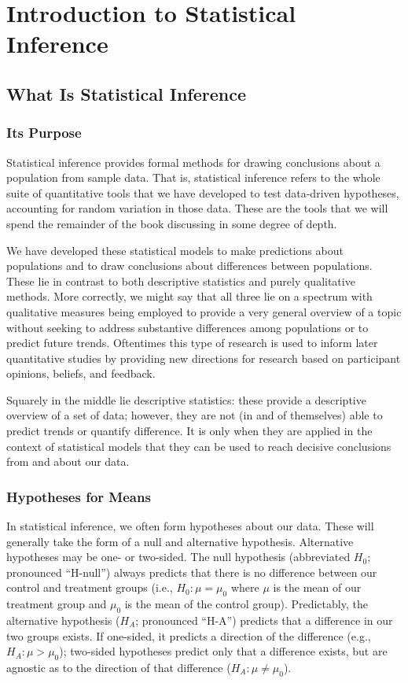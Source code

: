 
\chapter{Introduction to Statistical Inference}

\section{What Is Statistical Inference}

\subsection{Its Purpose}
Statistical inference provides formal methods for drawing conclusions about a population from sample data. That is, statistical inference refers to the whole suite of quantitative tools that we have developed to test data-driven hypotheses, accounting for random variation in those data. These are the tools that we will spend the remainder of the book discussing in some degree of depth.

We have developed these statistical models to make predictions about populations and to draw conclusions about differences between populations. These lie in contrast to both descriptive statistics and purely qualitative methods. More correctly, we might say that all three lie on a spectrum with qualitative measures being employed to provide a very general overview of a topic without seeking to address substantive differences among populations or to predict future trends. Oftentimes this type of research is used to inform later quantitative studies by providing new directions for research based on participant opinions, beliefs, and feedback.

Squarely in the middle lie descriptive statistics: these provide a descriptive overview of a set of data; however, they are not (in and of themselves) able to predict trends or quantify difference. It is only when they are applied in the context of statistical models that they can be used to reach decisive conclusions from and about our data.

\subsection{Hypotheses for Means}
In statistical inference, we often form hypotheses about our data. These will generally take the form of a null and alternative hypothesis. Alternative hypotheses may be one- or two-sided. The null hypothesis  (abbreviated $H_0$; pronounced ``H-null'') always predicts that there is no difference between our control and treatment groups (i.e., $H_0: \mu=\mu_0$ where $\mu$ is the mean of our treatment group and $\mu_0$ is the mean of the control group). Predictably, the alternative hypothesis  ($H_A$; pronounced ``H-A'') predicts that a difference in our two groups exists. If one-sided, it predicts a direction of the difference (e.g., $H_A: \mu > \mu_0$); two-sided hypotheses predict only that a difference exists, but are agnostic as to the direction of that difference ($H_A: \mu \neq \mu_0$).

